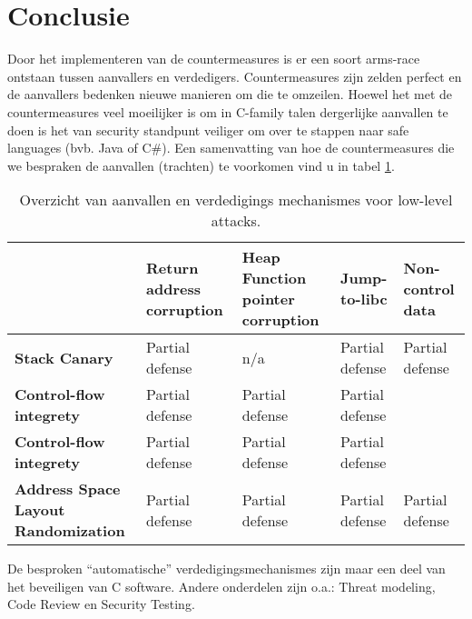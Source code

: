 \documentclass[../main.tex]{subfiles}
\begin{document}
\section{Conclusie}
Door het implementeren van de countermeasures is er een soort arms-race ontstaan tussen aanvallers en verdedigers.
Countermeasures zijn zelden perfect en de aanvallers bedenken nieuwe manieren om die te omzeilen.
Hoewel het met de countermeasures veel moeilijker is om in C-family talen dergerlijke aanvallen te doen is het van security standpunt veiliger om over te stappen naar safe languages (bvb. Java of C\#).
Een samenvatting van hoe de countermeasures die we bespraken de aanvallen (trachten) te voorkomen vind u in tabel \ref{t:overview}.
\begin{table}
		\begin{tabular}{|p{3cm}| p{3cm} p{3cm} p{3cm} p{3cm}|}
				\hline
				& \textbf{Return address corruption} & \textbf{Heap Function pointer corruption} & \textbf{Jump-to-libc} & \textbf{Non-control data} \\ \hline \hline
				\textbf{Stack Canary} & Partial defense & n/a & Partial defense & Partial defense \\ \hline
				\textbf{Control-flow integrety} & Partial defense & Partial defense & Partial defense & \\ \hline
				\textbf{Control-flow integrety} &  Partial defense & Partial defense & Partial defense & \\ \hline
				\textbf{Address Space Layout Randomization} &  Partial defense & Partial defense & Partial defense & Partial defense \\ \hline
		\end{tabular}
		\caption{Overzicht van aanvallen en verdedigings mechanismes voor low-level attacks.}
		\label{t:overview}
\end{table}

De besproken ``automatische'' verdedigingsmechanismes zijn maar een deel van het beveiligen van C software.
Andere onderdelen zijn o.a.: Threat modeling, Code Review en Security Testing.
\end{document}
